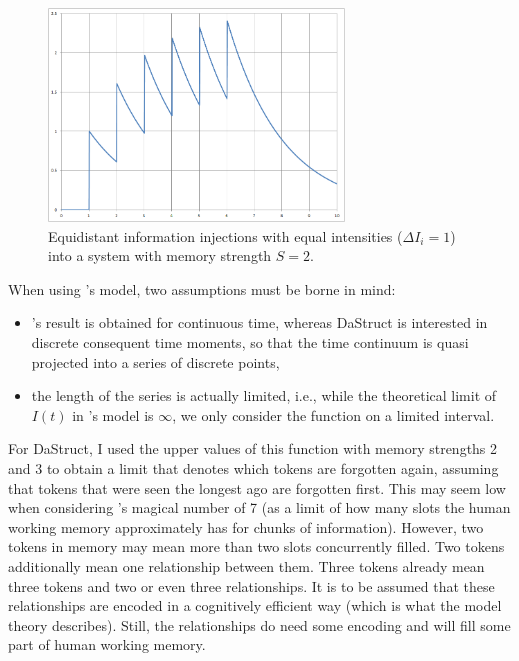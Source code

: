 \documentclass[hidelinks]{scrartcl}
\begin{document}
\begin{figure}[H]
\centering
\includegraphics[width=0.7\textwidth]{Illustrations/Equidistant_equiintense_with_S=2.png}
\caption{Equidistant information injections with equal intensities ($\Delta I_i = 1$) into a system with memory strength $S=2$.}
\label{fig:Equidistant equiintense information injections into a system with memory strength 2}
\end{figure}

When using \cite{Yffelti.2016}'s model, two assumptions must be borne in mind:
\begin{itemize}
	\item \cite{Yffelti.2016}'s result is obtained for continuous time, whereas DaStruct is interested in discrete consequent time moments, so that the time continuum is quasi projected into a series of discrete points,
	\item the length of the series is actually limited, i.e., while the theoretical limit of $I(t)$ in  \cite{Yffelti.2016}'s model is $\infty$, we only consider the function on a limited interval.
\end{itemize}

For DaStruct, I used the upper values of this function with memory strengths 2 and 3 to obtain a limit that denotes which tokens are forgotten again, assuming that tokens that were seen the longest ago are forgotten first. This may seem low when considering \cite{Miller.1956}'s magical number of 7 (as a limit of how many slots the human working memory approximately has for chunks of information). However, two tokens in memory may mean more than two slots concurrently filled. Two tokens additionally mean one relationship between them. Three tokens already mean three tokens and two or even three relationships. It is to be assumed that these relationships are encoded in a cognitively efficient way (which is what the model theory describes). Still, the relationships do need some encoding and will fill some part of human working memory. \\
\end{document}
